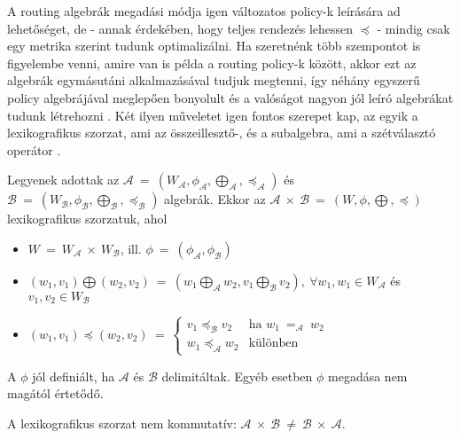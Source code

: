   A routing algebrák megadási módja igen változatos policy-k leírására ad lehetőséget, de - annak érdekében, hogy teljes rendezés lehessen $\preceq$ - mindig csak egy metrika szerint tudunk optimalizálni. Ha szeretnénk több szempontot is figyelembe venni, amire van is példa a routing policy-k között, akkor ezt az algebrák egymásutáni alkalmazásával tudjuk megtenni, így néhány egyszerű policy algebrájával meglepően bonyolult és a valóságot nagyon jól leíró algebrákat tudunk létrehozni \cite{Sobrinho_Metarouting}. Két ilyen műveletet igen fontos szerepet kap, az egyik a lexikografikus szorzat, ami az összeillesztő-, és a subalgebra, ami a szétválasztó operátor \cite{Lexicographic_products_in_metarouting}.

  \begin{definition} 
    Legyenek adottak az $\mathcal{A}~=~(W_{\mathcal{A}},\phi_{\mathcal{A}},\bigoplus_{\mathcal{A}}, \preceq_{\mathcal{A}})$ és\\ $\mathcal{B}~=~(W_{\mathcal{B}},\phi_{\mathcal{B}},\bigoplus_{\mathcal{B}},\preceq_{\mathcal{B}})$ algebrák. Ekkor az $\mathcal{A}~\times~\mathcal{B}~=~(W,\phi,\bigoplus,\preceq)$ lexikografikus szorzatuk, ahol
    \begin{itemize}
    \item $W~=~W_{\mathcal{A}}~\times~W_{\mathcal{B}}$, ill. $\phi ~=~ (\phi_{\mathcal{A}}, \phi_{\mathcal{B}})$
    \item $(w_{1},v_{1}) \bigoplus (w_{2},v_{2})~=~ (w_{1} \bigoplus_{\mathcal{A}} w_{2},v_{1} \bigoplus_{\mathcal{B}} v_{2}),~\forall w_{1},w_{1} \in W_{\mathcal{A}}$ és $v_{1}, v_{2} \in W_{\mathcal{B}}$
    \item $(w_{1},v_{1}) \preceq (w_{2}, v_{2})~=~
    \begin{cases}
      v_{1} \preceq_{\mathcal{B}} v_{2} & \text{ha } w_{1}~=_{\mathcal{A}}~w_{2} \\
      w_{1} \preceq_{\mathcal{A}} w_{2} & \text{különben}
    \end{cases}$
    \end{itemize}
  \end{definition}

  \begin{note}
    A $\phi$ jól definiált, ha $\mathcal{A}$ és $\mathcal{B}$ delimitáltak. Egyéb esetben $\phi$ megadása nem magától értetődő.
  \end{note}
  \begin{note}
    A lexikografikus szorzat nem kommutatív: $\mathcal{A}~\times~\mathcal{B}~\neq~\mathcal{B}~\times~\mathcal{A}$.
  \end{note}

